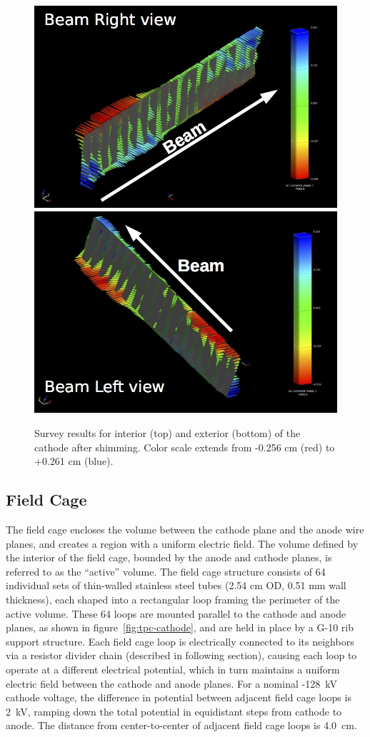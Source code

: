 \begin{figure}
\centering
\includegraphics[width=0.75\linewidth]{figures/cathode_right.jpg}
\includegraphics[width=0.75\linewidth]{figures/cathode_left.jpg}
\caption{Survey results for interior (top) and exterior (bottom) of the cathode after shimming.  Color scale extends from -0.256 cm (red) to +0.261 cm (blue).}
\label{fig:tpc-cathode-survey}
\end{figure}

\subsection{Field Cage}
The field cage encloses the volume between the cathode plane and the anode wire planes, and creates a region with a uniform electric field.  The volume defined by the interior of the field cage, bounded by the anode and cathode planes, is referred to as the ``active'' volume.   The field cage structure consists of 64 individual sets of thin-walled stainless steel tubes (2.54 cm OD, 0.51 mm wall thickness), each shaped into a rectangular loop framing the perimeter of the active volume. These 64 loops are mounted parallel to the cathode and anode planes, as shown in figure~\ref{fig:tpc-cathode}, and are held in place by a G-10 rib support structure. Each field cage loop is electrically connected to its neighbors via a resistor divider chain (described in following section), causing each loop to operate at a different electrical potential, which in turn maintains a uniform electric field between the cathode and anode planes. For a nominal -128~kV cathode voltage, the difference in potential between adjacent field cage loops is 2~kV, ramping down the total potential in equidistant steps from cathode to anode. The distance from center-to-center of adjacent field cage loops is 4.0~cm.

